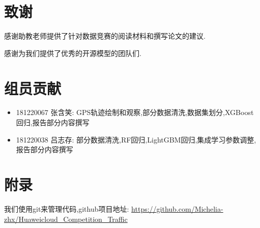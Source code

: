 \documentclass[a4paper,UTF8]{article}
\begin{document}
\section{致谢}
感谢助教老师提供了针对数据竞赛的阅读材料和撰写论文的建议.

感谢为我们提供了优秀的开源模型的团队们.




\section{组员贡献}
\begin{itemize}
	\item 181220067 张含笑: GPS轨迹绘制和观察,部分数据清洗,数据集划分,XGBoost回归,报告部分内容撰写
	\item 181220038 吕志存: 部分数据清洗,RF回归,LightGBM回归,集成学习参数调整,报告部分内容撰写
\end{itemize}

\section{附录}
我们使用git来管理代码,github项目地址: \url{https://github.com/Michelia-zhx/Huaweicloud_Competition_Traffic}
\end{document}
